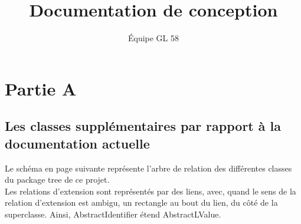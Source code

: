 \documentclass[a4paper]{article}
\title{Documentation de conception}
\author{\'Equipe GL 58}
\begin{document}
\maketitle

\section{Partie A}

\subsection{Les classes supplémentaires par rapport à la documentation actuelle}

Le schéma en page suivante représente l'arbre de relation des différentes classes du package tree de ce projet.\\ Les relations d'extension sont représentés par des liens, avec, quand le sens de la relation d'extension est ambigu, un rectangle au bout du lien, du côté de la superclasse. Ainsi, AbstractIdentifier étend AbstractLValue. \\
\end{document}
